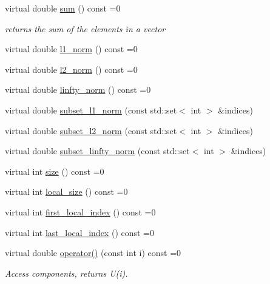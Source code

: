 \begin{DoxyCompactItemize}
virtual double \mbox{\hyperlink{classfemus_1_1_numeric_vector_aa26920ed5ca50ba8c595f9b6d608db9a}{sum}} () const =0
\begin{DoxyCompactList}\small\item\em returns the sum of the elements in a vector \end{DoxyCompactList}\item 
virtual double \mbox{\hyperlink{classfemus_1_1_numeric_vector_acf36fd402fe969244682a009f46d8f8c}{l1\+\_\+norm}} () const =0
\item 
virtual double \mbox{\hyperlink{classfemus_1_1_numeric_vector_aa86bfb1f5b0cb1f61dbb564764b44370}{l2\+\_\+norm}} () const =0
\item 
virtual double \mbox{\hyperlink{classfemus_1_1_numeric_vector_ad110dd5f363f806eef72b67f8756be36}{linfty\+\_\+norm}} () const =0
\item 
virtual double \mbox{\hyperlink{classfemus_1_1_numeric_vector_a31ab593cb8e23427dfc052f722534bff}{subset\+\_\+l1\+\_\+norm}} (const std\+::set$<$ int $>$ \&indices)
\item 
virtual double \mbox{\hyperlink{classfemus_1_1_numeric_vector_a5fe444121af2d624e9385c52be03d21c}{subset\+\_\+l2\+\_\+norm}} (const std\+::set$<$ int $>$ \&indices)
\item 
virtual double \mbox{\hyperlink{classfemus_1_1_numeric_vector_a7f43523d987d66bf1471867fc01dd3ec}{subset\+\_\+linfty\+\_\+norm}} (const std\+::set$<$ int $>$ \&indices)
\item 
virtual int \mbox{\hyperlink{classfemus_1_1_numeric_vector_a54137bb26362db737820d48b5c6169ed}{size}} () const =0
\item 
virtual int \mbox{\hyperlink{classfemus_1_1_numeric_vector_a8d012b41e20b62c55d4823b7fe008afb}{local\+\_\+size}} () const =0
\item 
virtual int \mbox{\hyperlink{classfemus_1_1_numeric_vector_a0249a27bfb19a2b8c7eb87b30b3e8ec0}{first\+\_\+local\+\_\+index}} () const =0
\item 
virtual int \mbox{\hyperlink{classfemus_1_1_numeric_vector_a801088d0a16b73338893411c00b594a0}{last\+\_\+local\+\_\+index}} () const =0
\item 
virtual double \mbox{\hyperlink{classfemus_1_1_numeric_vector_ab54106edd2a7508e3b926d7e29772c20}{operator()}} (const int i) const =0
\begin{DoxyCompactList}\small\item\em Access components, returns {\ttfamily U(i)}. \end{DoxyCompactList}\item 

\end{DoxyCompactItemize}
